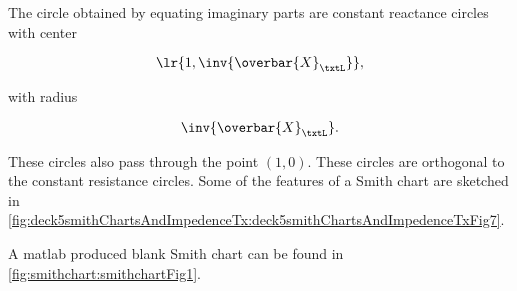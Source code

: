 The circle obtained by equating imaginary parts are constant reactance circles with center

\begin{dmath}\label{eqn:uwavesDeck5SmithChartCore:640}
\lr{ 1, \inv{\overbar{X}_\txtL } }, 
\end{dmath}

with radius 

\begin{dmath}\label{eqn:uwavesDeck5SmithChartCore:660}
\inv{\overbar{X}_\txtL}.
\end{dmath}

These circles also pass through the point \( (1,0) \).  These circles are orthogonal to the constant resistance circles.  Some of the features of a Smith chart are sketched in \cref{fig:deck5smithChartsAndImpedenceTx:deck5smithChartsAndImpedenceTxFig7}.


A matlab produced blank Smith chart can be found in \cref{fig:smithchart:smithchartFig1}.


